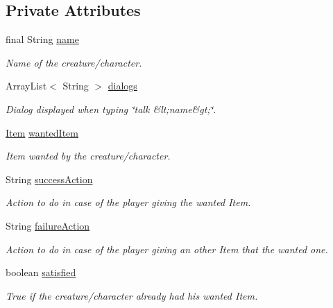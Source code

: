 \subsection*{Private Attributes}
\begin{DoxyCompactItemize}
\item 
final String \hyperlink{classpkg__world_1_1pkg__characters_1_1Character_a54831aae75fcaacb68cb500a12ffe457}{name}
\begin{DoxyCompactList}\small\item\em Name of the creature/character. \end{DoxyCompactList}\item 
Array\-List$<$ String $>$ \hyperlink{classpkg__world_1_1pkg__characters_1_1Character_a4747943f9a5d0f11605230df4d2559d2}{dialogs}
\begin{DoxyCompactList}\small\item\em Dialog displayed when typing \char`\"{}talk \&lt;name\&gt;\char`\"{}. \end{DoxyCompactList}\item 
\hyperlink{classpkg__world_1_1pkg__items_1_1Item}{Item} \hyperlink{classpkg__world_1_1pkg__characters_1_1Character_a3e5abf14759d18446163db9597d10a44}{wanted\-Item}
\begin{DoxyCompactList}\small\item\em Item wanted by the creature/character. \end{DoxyCompactList}\item 
String \hyperlink{classpkg__world_1_1pkg__characters_1_1Character_a3f1c0fc80b859a8625f334782b1bb74a}{success\-Action}
\begin{DoxyCompactList}\small\item\em Action to do in case of the player giving the wanted Item. \end{DoxyCompactList}\item 
String \hyperlink{classpkg__world_1_1pkg__characters_1_1Character_add959e452ec866785ef0d48f054b13ab}{failure\-Action}
\begin{DoxyCompactList}\small\item\em Action to do in case of the player giving an other Item that the wanted one. \end{DoxyCompactList}\item 
boolean \hyperlink{classpkg__world_1_1pkg__characters_1_1Character_a63a989f34f7ec28cf9e8c6c2a19c7daa}{satisfied}
\begin{DoxyCompactList}\small\item\em True if the creature/character already had his wanted Item. \end{DoxyCompactList}\end{DoxyCompactItemize}


